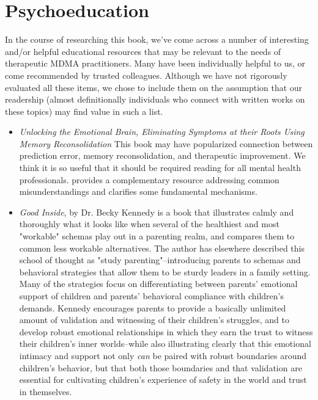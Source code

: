 \documentclass[12pt,letterpaper]{book}
\begin{document}
\chapter{Psychoeducation}
\label{sec:psychoeducation}
In the course of researching this book, we've come across a number of interesting and/or helpful educational resources that may be relevant to the needs of therapeutic MDMA practitioners. Many have been individually helpful to us, or come recommended by trusted colleagues. Although we have not rigorously evaluated all these items, we chose to include them on the assumption that our readership (almost definitionally individuals who connect with written works on these topics) may find value in such a list.
\begin{itemize}
    \item \textit{Unlocking the Emotional Brain, Eliminating Symptoms at their Roots Using Memory Reconsolidation} This book may have popularized connection between prediction error, memory reconsolidation, and therapeutic improvement. We think it is so useful that it should be required reading for all mental health professionals. \textcite{ecker2015misunderstood} provides a complementary resource addressing common misunderstandings and clarifies some fundamental mechanisms.
    \item \textit{Good Inside}, by Dr. Becky Kennedy \cite{kennedy2022good} is a book that illustrates calmly and thoroughly what it looks like when several of the healthiest and most "workable" schemas play out in a parenting realm, and compares them to common less workable alternatives. The author has elsewhere described this school of thought as "study parenting"–introducing parents to schemas and behavioral strategies that allow them to be sturdy leaders in a family setting. Many of the strategies focus on differentiating between parents' emotional support of children and parents' behavioral compliance with children's demands. Kennedy encourages parents to provide a basically unlimited amount of validation and witnessing of their children's struggles, and to develop robust emotional relationships in which they earn the trust to witness their children's inner worlds–while also illustrating clearly that this emotional intimacy and support not only \textit{can} be paired with robust boundaries around children's behavior, but that both those boundaries and that validation are essential for cultivating children's experience of safety in the world and trust in themselves. 


\end{itemize}
\end{document}
